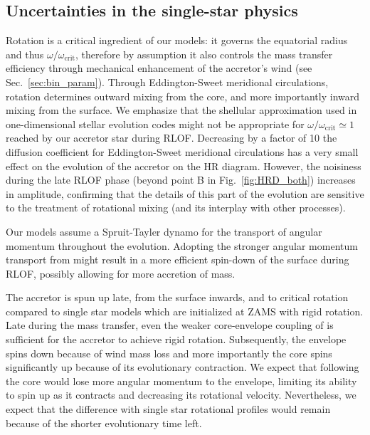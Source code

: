 \documentclass[twocolumn,twocolappendix,trackchanges]{aastex63}
\DeclareRobustCommand{\Figref}[1]{Fig.~\ref{#1}}
\DeclareRobustCommand{\Secref}[1]{Sec.~\ref{#1}}
\begin{document}
\subsection{Uncertainties in the single-star physics}
\label{sec:single_star_uncertainties}
Rotation is a critical ingredient of our models: it governs the
equatorial radius and thus $\omega/\omega_\mathrm{crit}$, therefore by
assumption it also controls the mass transfer efficiency through
mechanical enhancement of the accretor's wind (see
\Secref{sec:bin_param}). Through Eddington-Sweet meridional
circulations, rotation determines outward mixing from the core, and
more importantly inward mixing from the surface.  We emphasize that
the shellular approximation used in one-dimensional stellar evolution
codes might not be appropriate for
$\omega/\omega_\mathrm{crit}\simeq 1$ reached by our accretor star
during RLOF. Decreasing by a factor of 10 the diffusion coefficient
for Eddington-Sweet meridional circulations has a very small effect on
the evolution of the accretor on the HR diagram. However, the noisiness during the
late RLOF phase (beyond point B in \Figref{fig:HRD_both}) increases in
amplitude, confirming that the details of this part of the evolution
are sensitive to the treatment of rotational mixing (and its interplay
with other processes). %

Our models assume a Spruit-Tayler dynamo \citep{spruit:02} for the
transport of angular momentum throughout the evolution. Adopting the
stronger angular momentum transport from \cite{fuller:19} might result
in a more efficient spin-down of the surface during RLOF, possibly
allowing for more accretion of mass.

The accretor is spun up late, from the surface inwards, and to
critical rotation compared to single star models which are initialized
at ZAMS with rigid rotation. Late during the mass transfer, even the
weaker core-envelope coupling of \cite{spruit:02} is sufficient for
the accretor to achieve rigid rotation. Subsequently, the envelope
spins down because of wind mass loss and more importantly the core
spins significantly up because of its evolutionary contraction. We
expect that following \cite{fuller:19} the core would lose more
angular momentum to the envelope, limiting its ability to spin up as
it contracts and decreasing its rotational velocity.
Nevertheless, we expect that the difference with single star
rotational profiles would remain because of the shorter evolutionary time left.
\end{document}
